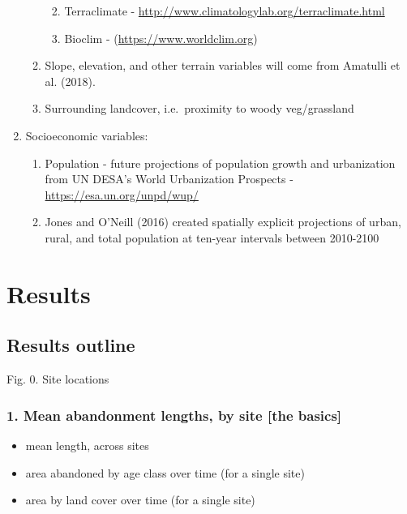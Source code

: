 \documentclass[
]{article}
\providecommand{\tightlist}{%
  \setlength{\itemsep}{0pt}\setlength{\parskip}{0pt}}
\begin{document}
\begin{enumerate}
\begin{enumerate}
    \begin{enumerate}
    \def\labelenumiii{\roman{enumiii}.}
    \tightlist
    \item
      Terraclimate - \url{http://www.climatologylab.org/terraclimate.html}
    \item
      Bioclim - (\url{https://www.worldclim.org})
    \end{enumerate}
  \item
    Slope, elevation, and other terrain variables will come from Amatulli et al. (2018).
  \item
    Surrounding landcover, i.e.~proximity to woody veg/grassland
  \end{enumerate}
\item
  Socioeconomic variables:

  \begin{enumerate}
  \def\labelenumii{\alph{enumii}.}
  \tightlist
  \item
    Population - future projections of population growth and urbanization from UN DESA's World Urbanization Prospects - \url{https://esa.un.org/unpd/wup/}
  \item
    Jones and O'Neill (2016) created spatially explicit projections of urban, rural, and total population at ten-year intervals between 2010-2100
  \end{enumerate}
\end{enumerate}

\hypertarget{results}{%
\section{Results}\label{results}}

\hypertarget{results-outline}{%
\subsection{Results outline}\label{results-outline}}

Fig. 0. Site locations

\hypertarget{mean-abandonment-lengths-by-site-the-basics}{%
\subsubsection{1. Mean abandonment lengths, by site {[}the basics{]}}\label{mean-abandonment-lengths-by-site-the-basics}}

\begin{itemize}
\tightlist
\item
  mean length, across sites
\item
  area abandoned by age class over time (for a single site)
\item
  area by land cover over time (for a single site)
\end{itemize}
\end{document}
